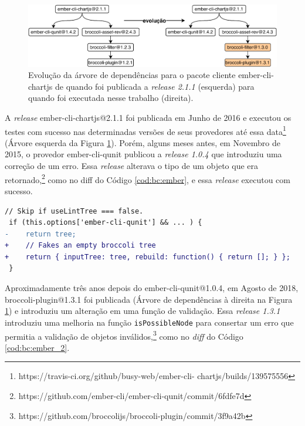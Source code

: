 \begin{figure}
    \centering
    \includegraphics[scale=0.9]{figuras/bc_example_full.pdf}
    \caption{Evolução da árvore de dependências para o pacote cliente \textsf{ember-cli-chartjs} de quando foi publicada a \textit{release 2.1.1} (esquerda) para quando foi executada nesse trabalho (direita).}
    \label{fig:dependency_tree}
\end{figure}

A \textit{release} \textsf{ember-cli-chartjs@2.1.1} foi publicada em Junho de 2016 e executou os testes com sucesso nas determinadas versões de seus provedores até essa data\footnote{https://travis-ci.org/github/busy-web/ember-cli-
chartjs/builds/139575556} (Árvore esquerda da Figura \ref{fig:dependency_tree}). Porém, alguns meses antes, em Novembro de 2015, o provedor \textsf{ember-cli-qunit} publicou a \textit{release 1.0.4} que introduziu uma correção de um erro. Essa \textit{release} alterava o tipo de um objeto que era retornado,\footnote{https://github.com/ember-cli/ember-cli-qunit/commit/6fdfe7d} como no diff do Código \ref{cod:bc:ember}, e essa \textit{release} executou com sucesso.

\begin{lstlisting}[numbers=none, language=diff, label=cod:bc:ember, caption={Alteração no tipo do objeto retornado em \textsf{ember-cli-qunit@1.0.4}.}]
 // Skip if useLintTree === false.
 if (this.options['ember-cli-qunit'] && ... ) {
-    return tree;
+    // Fakes an empty broccoli tree
+    return { inputTree: tree, rebuild: function() { return []; } };
 }
\end{lstlisting}

Aproximadamente três anos depois do \textsf{ember-cli-qunit@1.0.4}, em Agosto de 2018, \textsf{broccoli-plugin@1.3.1} foi publicada (Árvore de dependências à direita na Figura \ref{fig:dependency_tree}) e introduziu um alteração em uma função de validação. Essa \textit{release 1.3.1} introduziu uma melhoria na função \texttt{isPossibleNode} para consertar um erro que permitia a validação de objetos inválidos,\footnote{https://github.com/broccolijs/broccoli-plugin/commit/3f9a42b} como no \textit{diff} do Código \ref{cod:bc:ember_2}.

